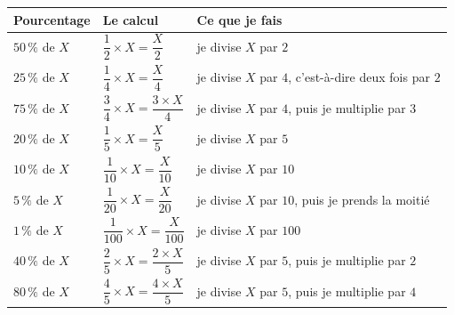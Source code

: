 \begin{aretenir}[title={Le tableau des pourcentages de base}]
\begin{center}
\renewcommand{\arraystretch}{1.5}
\newcommand{\rh}{\rule[-1.5em]{0pt}{4em}}
\begin{tabular}{|>{\centering\arraybackslash}m{2.5cm}
                |>{\centering\arraybackslash}m{4.3cm}
                |>{\raggedright\arraybackslash}m{6.2cm}|}
\hline
\rowcolor{entete}
\centering\textbf{Pourcentage} & \centering\textbf{Le calcul} & \textbf{Ce que je fais} \\
\hline
\rh $50\,\%$ de $X$  & $\dfrac{1}{2} \times X = \dfrac{X}{2}$
                 & je divise $X$ par $2$ \\ \hline
\rh $25\,\%$ de $X$  & $\dfrac{1}{4} \times X = \dfrac{X}{4}$
                 & je divise $X$ par $4$, c'est-à-dire deux fois par $2$ \\ \hline
\rh $75\,\%$ de $X$  & $\dfrac{3}{4} \times X = \dfrac{3 \times X}{4}$
                 & je divise $X$ par $4$, puis je multiplie par $3$ \\ \hline
\rh $20\,\%$ de $X$  & $\dfrac{1}{5} \times X = \dfrac{X}{5}$
                 & je divise $X$ par $5$ \\ \hline
\rh $10\,\%$ de $X$  & $\dfrac{1}{10} \times X = \dfrac{X}{10}$
                 & je divise $X$ par $10$ \\ \hline
\rh $5\,\%$ de $X$   & $\dfrac{1}{20} \times X = \dfrac{X}{20}$
                 & je divise $X$ par $10$, puis je prends la moitié \\ \hline
\rh $1\,\%$ de $X$   & $\dfrac{1}{100} \times X = \dfrac{X}{100}$
                 & je divise $X$ par $100$ \\ \hline
\rh $40\,\%$ de $X$  & $\dfrac{2}{5} \times X = \dfrac{2 \times X}{5}$
                 & je divise $X$ par $5$, puis je multiplie par $2$ \\ \hline
\rh $80\,\%$ de $X$  & $\dfrac{4}{5} \times X = \dfrac{4 \times X}{5}$
                 & je divise $X$ par $5$, puis je multiplie par $4$ \\ \hline
\end{tabular}
\end{center}
\end{aretenir}


